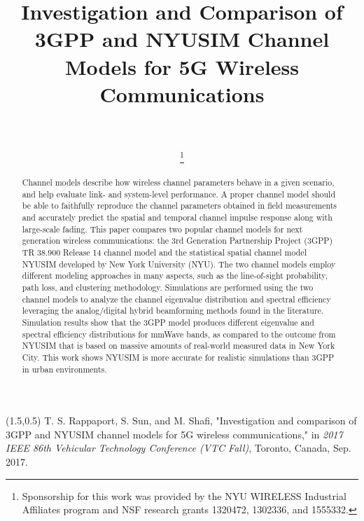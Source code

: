 \documentclass[journal]{IEEEtran}
\begin{document}
	\begin{textblock}{18.8}(1.5,0.5)
		\centering
		\noindent T. S. Rappaport, S. Sun, and M. Shafi, "Investigation and comparison of 3GPP and NYUSIM channel models for 5G wireless communications," in \textit{2017 IEEE 86th Vehicular Technology Conference (VTC Fall)}, Toronto, Canada, Sep. 2017.
	\end{textblock}
\title{Investigation and Comparison of 3GPP and NYUSIM Channel Models for 5G Wireless Communications}

\author{\\
	
	\thanks{Sponsorship for this work was provided by the NYU WIRELESS Industrial Affiliates program and NSF research grants 1320472, 1302336, and 1555332.}
}
\maketitle
\begin{abstract}
Channel models describe how wireless channel parameters behave in a given scenario, and help evaluate link- and system-level performance. A proper channel model should be able to faithfully reproduce the channel parameters obtained in field measurements and accurately predict the spatial and temporal channel impulse response along with large-scale fading. This paper compares two popular channel models for next generation wireless communications: the 3rd Generation Partnership Project (3GPP) TR 38.900 Release 14 channel model and the statistical spatial channel model NYUSIM developed by New York University (NYU). The two channel models employ different modeling approaches in many aspects, such as the line-of-sight probability, path loss, and clustering methodology. Simulations are performed using the two channel models to analyze the channel eigenvalue distribution and spectral efficiency leveraging the analog/digital hybrid beamforming methods found in the literature. Simulation results show that the 3GPP model produces different eigenvalue and spectral efficiency distributions for mmWave bands, as compared to the outcome from NYUSIM that is based on massive amounts of real-world measured data in New York City. This work shows NYUSIM is more accurate for realistic simulations than 3GPP in urban environments. 
\end{abstract}
\end{document}
